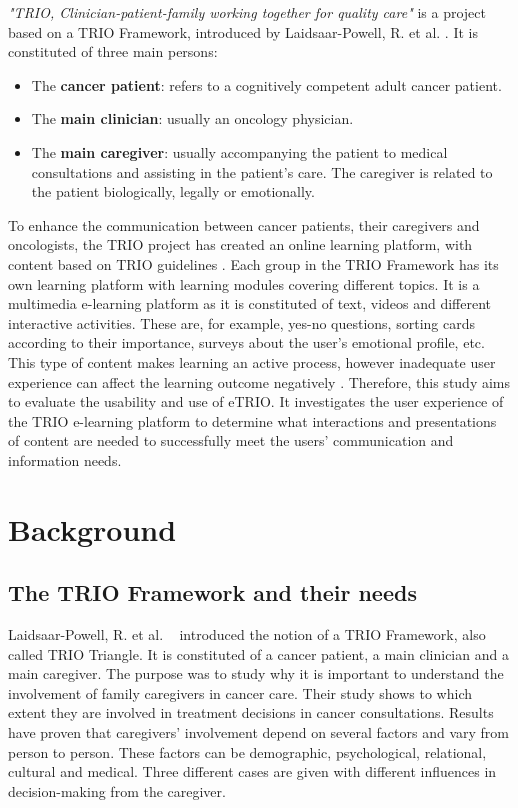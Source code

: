 \documentclass{sigchi}
\begin{document}
\textit{"TRIO, Clinician-patient-family working together for quality care"} is a project based on a TRIO Framework, introduced by Laidsaar-Powell, R. et al. \cite{Laidsaar-Powell2017}. It is constituted of three main persons:

\begin{itemize}[noitemsep]
    \item The \textbf{cancer patient}: refers to a cognitively competent adult cancer patient.
    \item The \textbf{main clinician}: usually an oncology physician.
    \item The \textbf{main caregiver}: usually accompanying the patient to medical consultations and assisting in the patient’s care. The caregiver is related to the patient biologically, legally or emotionally.
\end{itemize}

To enhance the communication between cancer patients, their caregivers and oncologists, the TRIO project has created an online learning platform, with content based on TRIO guidelines \cite{Laidsaar-Powell2018a, Laidsaar-Powell2018}. Each group in the TRIO Framework has its own learning platform with learning modules covering different topics. It is a multimedia e-learning platform as it is constituted of text, videos and different interactive activities. These are, for example, yes-no questions, sorting cards according to their importance, surveys about the user’s emotional profile, etc. This type of content makes learning an active process, however inadequate user experience can affect the learning outcome negatively \cite{Huang2005}. Therefore, this study aims to evaluate the usability and use of eTRIO. It investigates the user experience of the TRIO e-learning platform to determine what interactions and presentations of content are needed to successfully meet the users' communication and information needs.

\section{Background}

\subsection{The TRIO Framework and their needs}

Laidsaar-Powell, R. et al. ~\cite{Laidsaar-Powell2017} introduced the notion of a TRIO Framework, also called TRIO Triangle. It is constituted of a cancer patient, a main clinician and a main caregiver. The purpose was to study why it is important to understand the involvement of family caregivers in cancer care. Their study shows to which extent they are involved in treatment decisions in cancer consultations. Results have proven that caregivers’ involvement depend on several factors and vary from person to person. These factors can be demographic, psychological, relational, cultural and medical. Three different cases are given with different influences in decision-making from the caregiver.
\end{document}
